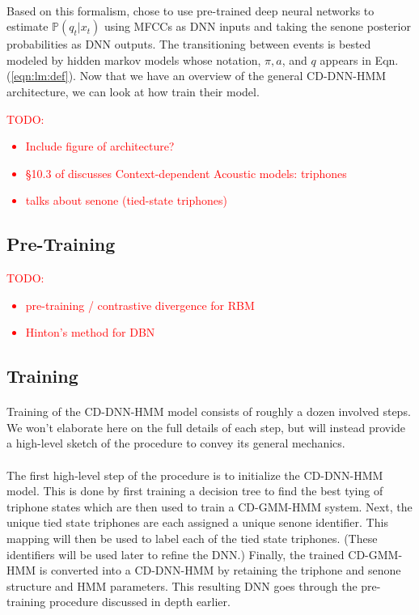 \documentclass[letterpaper]{article}
\newcommand{\TODO}[1]{\textcolor{red}{TODO: #1}}
\newcommand{\cprob}[2]{ \prob{#1 \lvert #2} }
\newcommand{\prob}[1]{\mathbb{P}\left( #1 \right)}
\begin{document}
\paragraph{} Based on this formalism, \cite{DBLP:journals/taslp/DahlYDA12} chose to use pre-trained deep neural networks to estimate $\cprob{q_t}{x_t}$ using MFCCs as DNN inputs and taking the senone posterior probabilities as DNN outputs. The transitioning between events is bested modeled by hidden markov models whose notation, $\pi, a$, and $q$ appears in Eqn. (\ref{eqn:lm:def}). Now that we have an overview of the general CD-DNN-HMM architecture, we can look at how \cite{DBLP:journals/taslp/DahlYDA12} train their model.

\TODO{\begin{itemize}
	\item Include figure of architecture?
	\item \S 10.3 of \cite{jurafskyMartin} discusses Context-dependent Acoustic models: triphones
	\item \cite{DBLP:conf/interspeech/2014} talks about senone (tied-state triphones)
\end{itemize}}

\subsection*{Pre-Training}


\TODO{\begin{itemize}
	\item pre-training / contrastive divergence for RBM
	\item Hinton's method for DBN
\end{itemize}}


\subsection*{Training}

\paragraph{} Training of the CD-DNN-HMM model consists of roughly a dozen involved steps. We won't elaborate here on the full details of each step, but will instead provide a high-level sketch of the procedure to convey its general mechanics. 

\paragraph{} The first high-level step of the procedure is to initialize the CD-DNN-HMM model. This is done by first training a decision tree to find the best tying of triphone states which are then used to train a CD-GMM-HMM system. Next, the unique tied state triphones are each assigned a unique senone identifier. This mapping will then be used to label each of the tied state triphones. (These identifiers will be used later to refine the DNN.) Finally, the trained CD-GMM-HMM is converted into a CD-DNN-HMM by retaining the triphone and senone structure and HMM parameters. This resulting DNN goes through the pre-training procedure discussed in depth earlier. 
\end{document}
